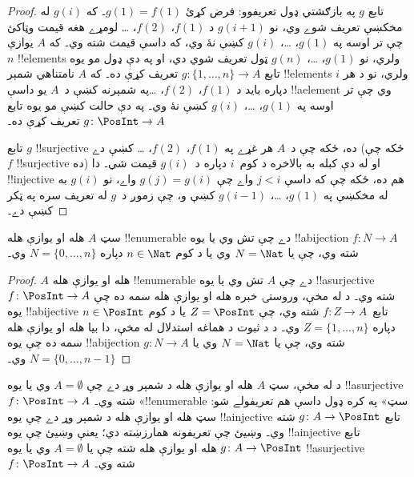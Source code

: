 \documentclass[../../../include/open-logic-section]{subfiles}
\begin{document}
\begin{proof}
  تابع $g$ په بازګشتي ډول تعريفوو: فرض کړئ $g(1) = f(1)$۔ که
  $g(i)$ له مخکښې تعريف شوے وي، نو $g(i+1)$ د $f(1)$،
  $f(2)$، \dots{} لومړے هغه قيمت وټاکئ چې تر اوسه په $g(1)$،
  \dots، $g(i)$ کښې نۀ وي، که داسې قيمت شته وي۔ که $A$ يوازې
  $n$ !!{element}s ولري، نو $g(1)$، \dots، $g(n)$ ټول تعريف
  شوي دي، او په دې ډول مو يوه تابع $g\colon \{1, \dots, n\}
  \to A$ تعريف کړې ده۔ که $A$ نامتناهي شمېر !!{element}s
  ولري، نو د هر $i$ دپاره بايد د $f(1)$، $f(2)$، \dots په
  شمېرنه کښې د~$A$ يو داسې !!a{element} وي چې تر اوسه په
  $g(1)$، \dots، $g(i)$ کښې نۀ وي۔ په دې حالت کښې مو يوه
  تابع $g\colon \PosInt \to A$ تعريف کړې ده۔
  
  تابع $g$ !!{surjective} ده، ځکه چې د~$A$ هر غړے په $f(1)$،
  $f(2)$، \dots{} کښې دے (ځکه چې $f$ !!{surjective} ده) او له
  دې کبله به بالاخره د کوم~$i$ دپاره د~$g(i)$ قيمت شي۔ دا
  !!{injective} هم ده، ځکه چې که داسې $j < i$ واے چې
  $g(j) = g(i)$ واے، نو $g(i)$ به له مخکښې په $g(1)$،
  \dots، $g(i-1)$ کښې و، چې زموږ د~$g$ له تعريف سره په ټکر کښې دے۔
\end{proof}

\begin{cor}
سټ $A$ هله او يوازې هله !!{enumerable} دے چې تش وي يا يوه
!!a{bijection} $f\colon N \to A$ شته وي، چې يا $N = \Nat$
وي يا د کوم $n \in \Nat$ دپاره $N = \{0, \dots, n\}$ وي۔
\end{cor}

\begin{proof}
$A$ هله او يوازې هله !!{enumerable} دے چې $A$ تش وي يا يوه
!!a{surjective} $f\colon \PosInt \to A$ شته وي۔ د
 له مخې، وروستۍ خبره هله او يوازې هله
سمه ده چې يوه !!a{bijective} تابع~$f\colon Z \to A$ شته وي،
چې $Z = \PosInt$ يا د کوم $n \in \PosInt$ دپاره
$Z = \{1, \dots, n\}$ وي۔ د  د ثبوت
د هماغه استدلال له مخې، دا بيا هله او يوازې هله سمه ده چې
يوه !!a{bijection} $g\colon N \to A$ شته وي، چې يا $N = \Nat$
وي يا $N = \{0, \dots, n-1\}$ وي۔
\end{proof}

\begin{prob}
  د  له مخې، سټ $A$ هله
  او يوازې هله د شمېر وړ دے چې $A = \emptyset$ وي يا يوه
  !!a{surjective} $f\colon \PosInt \to A$ شته وي۔ «!!{enumerable}
  سټ» په کره ډول داسې هم تعريفولے شو: سټ هله او يوازې هله
  د شمېر وړ دے چې يوه !!a{injective} تابع $g\colon A \to \PosInt$
  شته وي۔ وښيئ چې تعريفونه همارزښته دي؛ يعنې وښيئ چې يوه
  !!a{injective} تابع $g\colon A \to \PosInt$ هله او يوازې هله
  شته چې يا $A = \emptyset$ وي يا يوه !!a{surjective}
  $f\colon \PosInt \to A$ شته وي۔
\end{prob}
\end{document}
